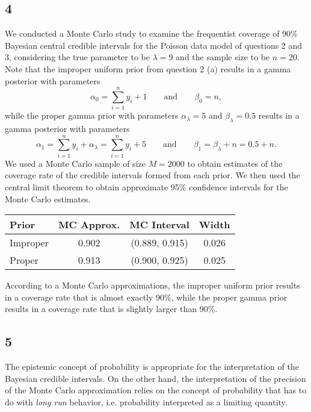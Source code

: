 \documentclass[12pt]{article}
\begin{document}
\subsection*{4} We conducted a Monte Carlo study to examine the frequentist coverage of 90\% Bayesian central credible intervals for the Poisson data model of
questions 2 and 3, considering the true parameter to be $\lambda = 9$ and the sample size to be $n = 20$. Note that the improper uniform prior from question 2 (a)
results in a gamma posterior with parameters 
\[ 
  \alpha_0 = \sum_{i=1}^{n}y_i + 1 \qquad \text{and} \qquad \beta_0 = n, 
\]
while the proper gamma prior with parameters $\alpha_{\lambda} = 5$ and $\beta_{\lambda} = 0.5$ results in a gamma posterior with parameters 
\[
  \alpha_1 = \sum_{i=1}^{n}y_i + \alpha_{\lambda} = \sum_{i=1}^n y_i + 5 \qquad \text{and} \qquad \beta_1 = \beta_{\lambda} + n = 0.5 + n.
\]
We used a Monte Carlo sample of size $M = 2000$ to obtain estimates of the coverage rate of the credible intervals formed from each prior. We then 
used the central limit theorem to obtain approximate 95\% confidence intervals for the Monte Carlo estimates.

\begin{table}[h]
  \centering
  \begin{tabular}{lccc}
    \hline
    Prior & MC Approx. & MC Interval & Width \\
    \hline
    Improper & 0.902 & (0.889, 0.915) & 0.026 \\
    Proper & 0.913 & (0.900, 0.925) & 0.025 \\
    \hline
  \end{tabular}
\end{table}

According to a Monte Carlo approximations, the improper uniform prior results in a coverage rate that is almost exactly 90\%, while the proper gamma
prior results in a coverage rate that is slightly larger than 90\%.


\subsection*{5} The epistemic concept of probability is appropriate for the interpretation of the Bayesian credible intervals.
On the other hand, the interpretation of the precision of the Monte Carlo approximation relies on the concept of probability that has to do with 
\emph{long run} behavior, i.e. probability interpreted as a limiting quantity.
\end{document}

